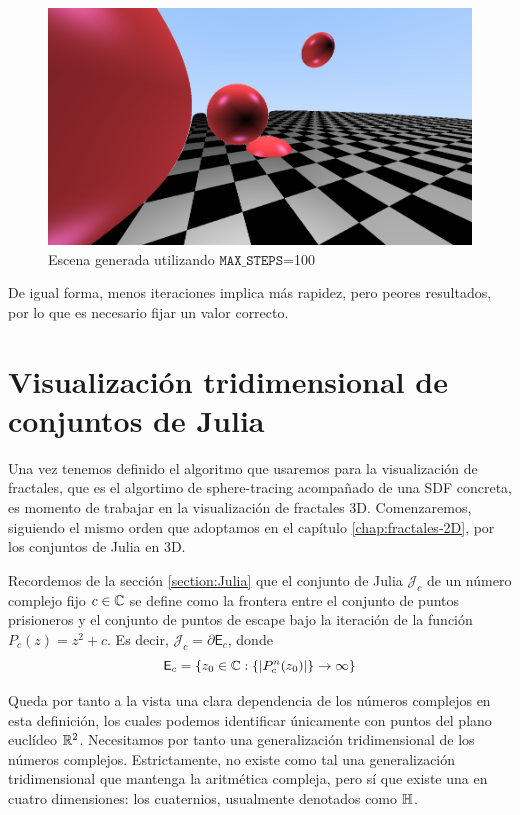 \begin{figure} [ht]
    \centering
    \includegraphics[scale = 0.3]{img/C8/pocas-iteraciones.png}
    \caption{Escena generada utilizando $\mathtt{MAX\_STEPS}$=100}
    \label{fig:pocas-iteraciones}
\end{figure}

De igual forma, menos iteraciones implica más rapidez, pero peores resultados, por lo que es necesario fijar un valor correcto.

\section{Visualización tridimensional de conjuntos de Julia}

Una vez tenemos definido el algoritmo que usaremos para la visualización de fractales, que es el algortimo de sphere-tracing acompañado de una SDF concreta, es momento de trabajar en la visualización de fractales 3D. Comenzaremos, siguiendo el mismo orden que adoptamos en el capítulo \ref{chap:fractales-2D}, por los conjuntos de Julia en 3D.

Recordemos de la sección \ref{section:Julia} que el conjunto de Julia $\mathcal{J}_c$ de un número complejo fijo $c\in\mathbb{C}$ se define como la frontera entre el conjunto de puntos prisioneros y el conjunto de puntos de escape bajo la iteración de la función $P_{c}(z)=z^2+c$. Es decir, $\mathcal{J}_c = \partial \mathsf{E}_c$, donde
\begin{equation}
    \mathsf{E}_c = \{z_0\in\mathbb{C}: \{|P_c^n(z_0)|\}\rightarrow \infty \}
\end{equation}

Queda por tanto a la vista una clara dependencia de los números complejos en esta definición, los cuales podemos identificar únicamente con puntos del plano euclídeo $\mathbb{R}^2$. Necesitamos por tanto una generalización tridimensional de los números complejos. Estrictamente, no existe como tal una generalización tridimensional que mantenga la aritmética compleja, pero sí que existe una en cuatro dimensiones: los cuaternios, usualmente denotados como $\mathbb{H}$.

